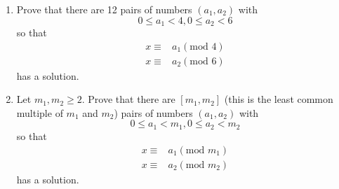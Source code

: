 \documentclass[letterpaper,12pt]{article}
\begin{document}
\begin{enumerate}
\item
Prove that there are 12 pairs of numbers $(a_1,a_2)$ with 
\[0\le a_1 <4, 0\le a_2<6\]
so that
\begin{align*}
x\equiv & a_1 (\text{mod }4)\\
x\equiv & a_2 (\text{mod }6)
\end{align*}
has a solution.

\item

Let $m_1,m_2\ge 2$. Prove that there are $[m_1,m_2]$ (this is the least common multiple of $m_1$ and $m_2$) pairs of numbers $(a_1,a_2)$ with 
\[0\le a_1 <m_1, 0\le a_2<m_2\]
so that
\begin{align*}
x\equiv & a_1 (\text{mod }m_1)\\
x\equiv & a_2 (\text{mod }m_2)
\end{align*}
has a solution.

\end{enumerate}
\end{document}
